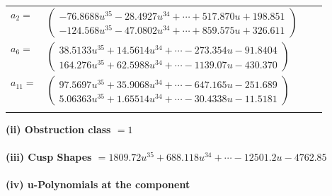 \documentclass[1p]{elsarticle_modified}
\theoremstyle{definition}
\begin{document}
\begin{tabular}{m{7pt} m{180pt} m{7pt} m{180pt} }
\flushright $a_{2}=$&$\begin{pmatrix}-76.8688 u^{35}-28.4927 u^{34}+\cdots+517.870 u+198.851\\-124.568 u^{35}-47.0802 u^{34}+\cdots+859.575 u+326.611\end{pmatrix}$ \\
\flushright $a_{6}=$&$\begin{pmatrix}38.5133 u^{35}+14.5614 u^{34}+\cdots-273.354 u-91.8404\\164.276 u^{35}+62.5988 u^{34}+\cdots-1139.07 u-430.370\end{pmatrix}$ \\
\flushright $a_{11}=$&$\begin{pmatrix}97.5697 u^{35}+35.9068 u^{34}+\cdots-647.165 u-251.689\\5.06363 u^{35}+1.65514 u^{34}+\cdots-30.4338 u-11.5181\end{pmatrix}$\\&\end{tabular}
\flushleft \textbf{(ii) Obstruction class $= 1$}\\~\\
\flushleft \textbf{(iii) Cusp Shapes $= 1809.72 u^{35}+688.118 u^{34}+\cdots-12501.2 u-4762.85$}\\~\\
\newpage\renewcommand{\arraystretch}{1}
\flushleft \textbf{(iv) u-Polynomials at the component}\newline \\
\end{document}
